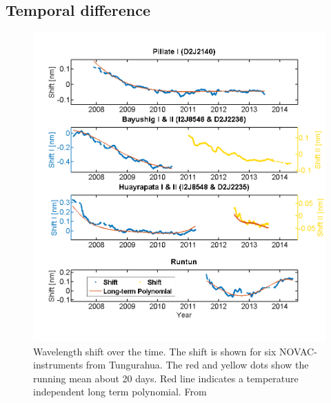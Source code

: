 \documentclass  [
  paper    = a4,
  BCOR     = 10mm,
  twoside,
  fontsize = 12pt,
  fleqn,
  toc      = bibnumbered,
  toc      = listofnumbered,
  numbers  = noendperiod,
  headings = normal,
  listof   = leveldown,
  version  = 3.03
]                                       {scrreprt}
\begin{document}
	\subsection{Temporal difference}
	\begin{figure}
		\centering
		\includegraphics[width=1\linewidth]{Bilder/Simon/Bilder_Tung/Drift_Komplett_NEW}
		\caption{Wavelength shift over the time. The shift is shown for six NOVAC- instruments from Tungurahua. The red and yellow dots show the running mean about 20 days. Red line indicates a temperature independent long term polynomial. From \cite{WarnachSimon}}
		\label{fig:driftkomplettnew}
	\end{figure}
\end{document}
